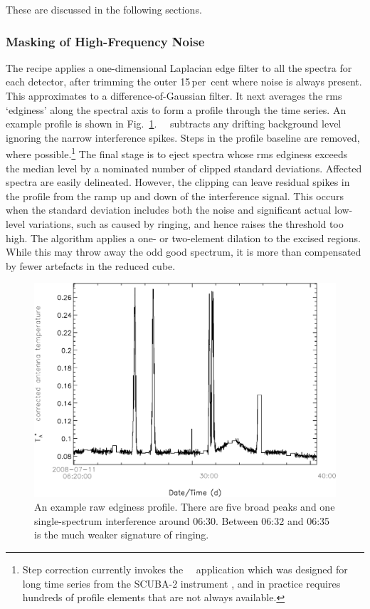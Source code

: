 \documentclass[final,authoryear,5p,times,twocolumn]{elsarticle}
\begin{document}
These are discussed in the following sections.

\subsubsection{Masking of High-Frequency Noise}

The recipe applies a one-dimensional Laplacian edge filter to all the
spectra for each detector, after trimming the outer 15\,per~cent where noise
is always present.  This approximates to a difference-of-Gaussian
filter.  It next averages the rms `edginess' along the spectral axis
to form a profile through the time series.  An example profile is
shown in Fig.~\ref{fig:badbase:raw_edginess_profile}.  \cupid\
\findback\ subtracts any drifting background level ignoring the narrow
interference spikes.  Steps in the profile baseline are removed, where
possible.\footnote{Step correction currently invokes the \smurf\ \fixsteps\
application which was designed for long time series from the SCUBA-2
instrument \citep{2013MNRAS.430.2513H}, and in practice
requires hundreds of profile elements that are not always available.}
The final stage is to eject spectra whose rms edginess exceeds the
median level by a nominated number of clipped standard deviations.
Affected spectra are easily delineated.  However, the clipping can
leave residual spikes in the profile from the ramp up and down of the
interference signal.  This occurs when the standard deviation includes
both the noise and significant actual low-level variations, such as
caused by ringing, and hence raises the threshold too high.  The
algorithm applies a one- or two-element dilation to the excised
regions.  While this may throw away the odd good spectrum, it is more
than compensated by fewer artefacts in the reduced cube.


\begin{figure}[t]
\includegraphics[width=\columnwidth]{raw_edginess_profile}
\caption{An example raw edginess profile.  There are five broad
  peaks and one single-spectrum interference around 06:30.  Between
  06:32 and 06:35 is the much weaker signature of ringing.}
\label{fig:badbase:raw_edginess_profile}
\end{figure}
\end{document}
